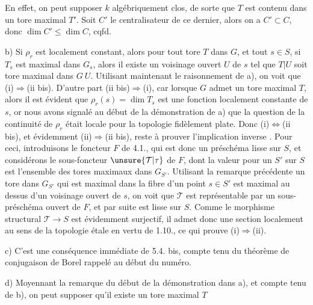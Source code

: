 En effet, on peut supposer $k$ algébriquement clos, de sorte que $T$ est contenu dans un tore maximal $T'$. Soit $C'$ le centralisateur de ce dernier, alors on a $C'\subset C$, donc $\dim C'\leq\dim C$, cqfd.

b)  Si $\rho_r$ est localement constant, alors pour tout tore $T$ dans $G$,  et tout $s\in S$, si $T_s$ est  maximal dans $G_s$, alors il existe un voisinage ouvert $U$ de $s$ tel que $T|U$ soit tore maximal dans $G\ U$. Utilisant maintenant le raisonnement de a), on voit que  (i)$\Longrightarrow$(ii bis). D'autre part (ii bis)$\Longrightarrow$(i), car  lorsque $G$ admet un tore maximal $T$, alors il est évident que $\rho_r(s)=\dim T_s$ est une fonction localement constante de  $s$, or nous avons signalé au début de la démonstration de a) que la question de la continuité de $\rho_r$ était locale pour la topologie fidèlement plate. Donc (i)$\Longleftrightarrow$(ii bis), et évidemment (ii)$\Longrightarrow$(ii bis), reste à prouver l'implication inverse . Pour ceci, introduisons le foncteur $F$ de  4.1., qui est donc un préschéma  lisse  sur $S$, et considérons le sous-foncteur $\unsure{\mathcal T|\tau}$ de $F$, dont la valeur  pour un $S'$ sur $S$ est l'ensemble des tores maximaux dans $G_{S'}$. Utilisant la remarque précédente  un tore dans $G_{S'}$ qui est maximal dans la fibre d'un point $s\in S'$ est maximal au dessus d'un voisinage ouvert de $s$, on voit que $\mathcal T$ est représentable par un sous-préschéma ouvert de $F$, et par suite est lisse  sur $S$. Comme le morphisme structural $\mathcal T\longrightarrow S$ est évidemment surjectif, il admet donc  une section localement au sens de la topologie étale en vertu de  1.10., ce qui prouve (i)$\Rightarrow$(ii).

c) C'est une conséquence immédiate de  5.4. bis, compte tenu du théorème de conjugaison de Borel rappelé au début du numéro.

d) Moyennant la remarque du début de la démonstration dans a), et compte tenu de b), on peut supposer qu'il existe un tore maximal $T$
